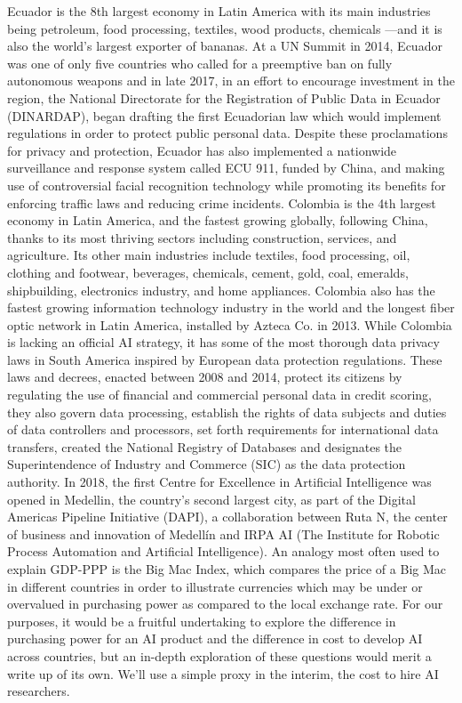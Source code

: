 \documentclass[conference]{IEEEtran}
\begin{document}
Ecuador is the 8th largest economy in Latin America with its main industries being petroleum, food processing, textiles, wood products, chemicals —and it is also the world's largest exporter of bananas. At a UN Summit in 2014, Ecuador was one of only five countries who called for a preemptive ban on fully autonomous weapons and in late 2017, in an effort to encourage investment in the region, the National Directorate for the Registration of Public Data in Ecuador (DINARDAP), began drafting the first Ecuadorian law which would implement regulations in order to protect public personal data. Despite these proclamations for privacy and protection, Ecuador has also implemented a nationwide surveillance and response system called ECU 911, funded by China, and making use of controversial facial recognition technology while promoting its benefits for enforcing traffic laws and reducing crime incidents.
Colombia is the 4th largest economy in Latin America, and the fastest growing globally, following China, thanks to its most thriving sectors including construction, services, and agriculture. Its other main industries include textiles, food processing, oil, clothing and footwear, beverages, chemicals, cement, gold, coal, emeralds, shipbuilding, electronics industry, and home appliances. Colombia also has the fastest growing information technology industry in the world and the longest fiber optic network in Latin America, installed by Azteca Co. in 2013.
While Colombia is lacking an official AI strategy, it has some of the most thorough data privacy laws in South America inspired by European data protection regulations. These laws and decrees, enacted between 2008 and 2014, protect its citizens by regulating the use of financial and commercial personal data in credit scoring, they also govern data processing, establish the rights of data subjects and duties of data controllers and processors, set forth requirements for international data transfers, created the National Registry of Databases and designates the Superintendence of Industry and Commerce (SIC) as the data protection authority. In 2018, the first Centre for Excellence in Artificial Intelligence was opened in Medellin, the country's second largest city, as part of the Digital Americas Pipeline Initiative (DAPI), a collaboration between Ruta N, the center of business and innovation of Medellín and IRPA AI (The Institute for Robotic Process Automation and Artificial Intelligence).
An analogy most often used to explain GDP-PPP is the Big Mac Index, which compares the price of a Big Mac in different countries in order to illustrate currencies which may be under or overvalued in purchasing power as compared to the local exchange rate. For our purposes, it would be a fruitful undertaking to explore the difference in purchasing power for an AI product and the difference in cost to develop AI across countries, but an in-depth exploration of these questions would merit a write up of its own. We'll use a simple proxy in the interim, the cost to hire AI researchers.
\end{document}
